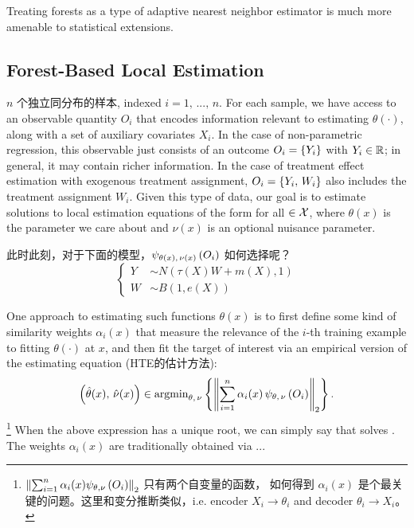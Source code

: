 \documentclass[aos]{imsart}
\theoremstyle{plain}
\theoremstyle{definition}
\theoremstyle{remark}
\begin{document}
\begin{CJK}{UTF8}{gbsn}
Treating forests as a type of adaptive nearest neighbor estimator is much more amenable to statistical extensions.

\subsection{Forest-Based Local Estimation}
\label{sec:ANN}

$n$ 个独立同分布的样本, indexed
$ i = 1, \, ..., \, n$. For each sample, we have
access to an observable quantity $O_i$ that encodes information
relevant to estimating $\theta(\cdot)$, along with a set of auxiliary covariates $X_i$. In the case of non-parametric
regression, this observable just consists of an outcome $O_i = \left\{Y_i\right\}$ with $Y_i \in \mathbb{R}$; in
general, it may contain richer information. In the case of treatment effect
estimation with exogenous treatment assignment, $O_i = \left\{Y_i, \, W_i\right\}$ also includes the treatment
assignment $W_i$.
Given this type of data, our goal is to estimate solutions to local estimation equations
of the form
 for all $\in \mathcal{X}$, 
where $\theta(x)$ is the parameter we care about and $\nu(x)$ is an optional
nuisance parameter.


此时此刻，对于下面的模型，$\psi_{\theta(x), \, \nu(x)}\left(O_i\right)$ 如何选择呢？
$$
\begin{cases}
Y &\sim N(\tau(X) W + m(X), 1) \\
W &\sim B(1,  e(X))
\end{cases}
$$



One approach to estimating such functions $\theta(x)$ is to first define
some kind of similarity weights $\alpha_i(x)$ that measure the relevance of the $i$-th training example to
fitting $\theta(\cdot)$ at $x$, and then fit the target of interest via an empirical version of the estimating equation (HTE的估计方法):
\begin{equation}
\label{eq:gee_estimate}
\p{\htheta(x), \, \hnu(x)} \in \argmin_{\theta, \, \nu} \cb{\Norm{\sum_{i = 1}^n \alpha_i(x) \, \psi_{\theta, \, \nu}\p{O_i}}_2}.
\end{equation}
\footnote{ $\left\lVert\sum_{i = 1}^n \alpha_i(x)  \psi_{\theta,  \nu}\left(O_i\right)\right\rVert_2$ 只有两个自变量的函数， 如何得到 $\alpha_i(x)$ 是个最关键的问题。这里和变分推断类似，i.e. encoder $X_i \to \theta_i$ and decoder $\theta_i \to X_i$。} When the above expression has a unique root, we can simply say that 
solves . The weights $\alpha_i(x)$ are traditionally obtained via ... 


\end{CJK}
\end{document}
